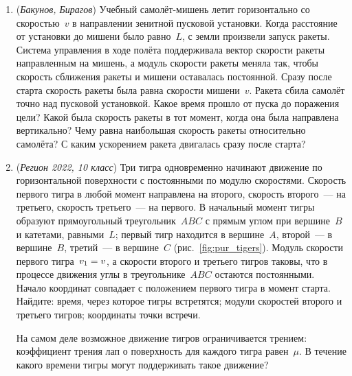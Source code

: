\documentclass[../main.tex]{subfiles}
\begin{document}
\begin{enumerate}[wide=0pt]
  \begin{figure}[h]\centering
    \begin{minipage}[b]{0.56\linewidth}\centering
      \caption{}\label{fig:pur_crossing}%
    \end{minipage}\hfill
    \begin{minipage}[b]{0.4\linewidth}\centering
      \caption{}\label{fig:pur_fox_angle}%
    \end{minipage}
  \end{figure}

  \item (\textit{Бакунов, Бирагов}) Учебный самолёт-мишень летит горизонтально со
  скоростью~$v$ в направлении зенитной пусковой установки. Когда расстояние от
  установки до мишени было равно~$L$, с земли произвели запуск ракеты. Система
  управления в ходе полёта поддерживала вектор скорости ракеты направленным на
  мишень, а модуль скорости ракеты меняла так, чтобы скорость сближения ракеты и
  мишени оставалась постоянной. Сразу после старта скорость ракеты была равна
  скорости мишени~$v$. Ракета сбила самолёт точно над пусковой установкой. Какое время
  прошло от пуска до поражения цели? Какой была скорость ракеты в тот момент, когда
  она была направлена вертикально? Чему равна наибольшая скорость ракеты относительно
  самолёта? С каким ускорением ракета двигалась сразу после старта?

  \item (\textit{Регион 2022, 10 класс}) Три тигра одновременно начинают движение по
  горизонтальной поверхности с постоянными по модулю скоростями. Скорость первого тигра
  в любой момент направлена на второго, скорость второго~--- на третьего, скорость
  третьего~--- на первого. В начальный момент тигры образуют прямоугольный треугольник~$ABC$ с прямым углом при вершине~$B$ и катетами, равными~$L$; первый тигр находится
  в вершине~$A$, второй~--- в вершине~$B$, \mbox{третий}~--- в вершине~$C$
  (рис.~\ref{fig:pur_tigers}). Модуль скорости первого тигра~$v_1 \hm= v$, а скорости второго и третьего тигров таковы, что в процессе движения углы
  в треугольнике~$ABC$ остаются постоянными. Начало координат совпадает с положением
  первого тигра в момент старта. Найдите: время, через которое тигры встретятся;
  модули скоростей второго и третьего тигров; координаты точки встречи.

  На самом деле возможное движение тигров ограничивается трением: коэффициент трения
  лап о поверхность для каждого тигра равен~$\mu$. В течение какого времени тигры
  могут поддерживать такое движение?


\end{enumerate}
\end{document}
